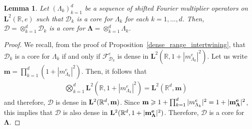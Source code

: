 \documentclass[12pt]{amsart}
\newcommand{\hlabel}{\phantomsection\label}
\numberwithin{equation}{section}
\newcommand{\bb}{\mathbb}
\newcommand{\cc}{\mathcal}
\renewcommand{\ge}{\geqslant}
\newcommand{\bmrm}[2][2]{\mathbf{#2}^{#1}}
\newcommand{\fouho}{\cc{F}^{e}}
\newcommand{\LRe}{\bmrm{L}(\bb{R},e)}
\newcommand{\cD}{\mathcal{D}}
\newtheorem{lem}[thm]{Lemma}
\theoremstyle{definition}
\theoremstyle{assump}
\theoremstyle{remark}
\begin{document}
{\begin{lem}\hlabel{lem:core_tensor}
	Let $(\Lambda_k)_{k=1}^d$ be a sequence of shifted Fourier multiplier operators on $\LRe$ such that $\cc{D}_k$ is a core for $\Lambda_k$ for each $k=1,\ldots, d$. Then, $\bm{\cc{D}}=\otimes_{k=1}^d\cc{D}_k$ is a core for $\bm{\Lambda}=\otimes_{k=1}^d\Lambda_k$.
\end{lem}
\begin{proof}
	We recall, from the proof of Proposition~\ref{dense_range_intertwining}, that $\cc{D}_k$ is a core for $\Lambda_k$ if and only if $\fouho_{\cc{D}_k}$ is dense in $\bmrm{L}(\bb R,1+|m^e_{\Lambda_k}|^2)$. Let us write $\mathbf{m}=\prod_{k=1}^d (1+|m^e_{\Lambda_k}|^2)$. Then, it follows that
\begin{align*}
	\bigotimes_{k=1}^d \bmrm{L}(\bb R,1+|m^e_{\Lambda_k}|^2)=\bmrm{L}(\bb R^d,\mathbf{m})
\end{align*}
and therefore, $\bm{\cc D}$ is dense in $\bmrm{L}(\bb R^d,{\bf m})$. Since $\mathbf{m}\ge 1+\prod_{k=1}^d |m^e_{\Lambda_k}|^2=1+|\mathbf{m}^{\bf e}_{\bm{\Lambda}}|^2$, this implies that $\bm{\cc D}$ is also dense in $\bmrm{L}(\bb R^d, 1+|\mathbf{m}^{\bf e}_{\bm{\Lambda}}|^2)$. Therefore, $\bm{\cD}$ is a core for $\bm{\Lambda}$.
\end{proof}

}
\end{document}
